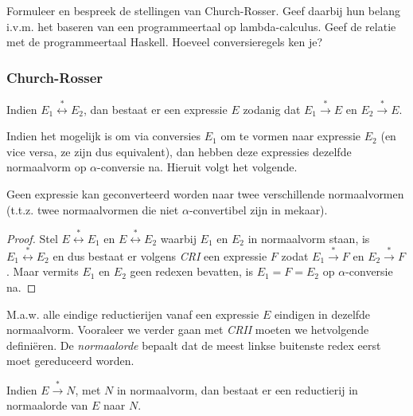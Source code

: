 \begin{quest}
	Formuleer en bespreek de stellingen van Church-Rosser. Geef daarbij hun belang i.v.m. het baseren van een programmeertaal op lambda-calculus. Geef de relatie met de programmeertaal Haskell. Hoeveel conversieregels ken je?
\end{quest}

\subsubsection*{Church-Rosser}

\begin{theorem}
	Indien $E_1 \stackrel{*}{\longleftrightarrow} E_2$, dan bestaat er een expressie $E$ zodanig dat $E_1 \stackrel{*}{\longrightarrow} E$ en $E_2 \stackrel{*}{\longrightarrow} E$.
\end{theorem}

Indien het mogelijk is om via conversies $E_1$ om te vormen naar expressie $E_2$ (en vice versa, ze zijn dus equivalent), dan hebben deze expressies dezelfde normaalvorm op $\alpha$-conversie na. Hieruit volgt het volgende.

\begin{theorem}
	Geen expressie kan geconverteerd worden naar twee verschillende normaalvormen (t.t.z. twee normaalvormen die niet $\alpha$-convertibel zijn in mekaar).
\end{theorem}

\begin{proof}
	Stel $E \stackrel{*}{\longleftrightarrow} E_1$ en $E \stackrel{*}{\longleftrightarrow} E_2$ waarbij $E_1$ en $E_2$ in normaalvorm staan, is $E_1 \stackrel{*}{\longleftrightarrow} E_2$ en dus bestaat er volgens \emph{CRI} een expressie $F$ zodat $E_1 \stackrel{*}{\longrightarrow} F$ en $E_2 \stackrel{*}{\longrightarrow} F$. Maar vermits $E_1$ en $E_2$ geen redexen bevatten, is $E_1 = F = E_2$ op $\alpha$-conversie na.
\end{proof}
M.a.w. alle eindige reductierijen vanaf een expressie $E$ eindigen in dezelfde normaalvorm. Vooraleer we verder gaan met \emph{CRII} moeten we hetvolgende defini\"eren. De \emph{normaalorde} bepaalt dat de meest linkse buitenste redex eerst moet gereduceerd worden.

\begin{theorem}
	Indien $E \stackrel{*}{\longrightarrow} N$, met $N$ in normaalvorm, dan bestaat er een reductierij in normaalorde van $E$ naar $N$.
\end{theorem}

